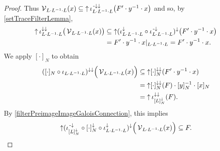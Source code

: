 \begin{proof}
Thus $\operatorname{\mathcal{V}}_{L\cdot L^{-1}\cdot L}(x) \subseteq \operatorname{\uparrow}\iota_{L\cdot L^{-1}\cdot L}^{{\text{\hspace{0.15em}-}\downarrow}\downarrow}\big(F'\cdot y^{-1}\cdot x\big)$ and so, by \ref{setTraceFilterLemma},
\begin{align*}
\operatorname{\uparrow} \iota_{L\cdot L^{-1}\cdot L}^{\downarrow\downarrow}\big(\operatorname{\mathcal{V}}_{L\cdot L^{-1}\cdot L}(x)\big) &\subseteq \operatorname{\uparrow}(\iota_{L\cdot L^{-1}\cdot L}^{\downarrow}\circ \iota_{L\cdot L^{-1}\cdot L}^{{\text{\hspace{0.15em}-}\downarrow}})^\downarrow\big(F'\cdot y^{-1}\cdot x\big) \\
&= F'\cdot y^{-1}\cdot x|_{L\cdot L^{-1}\cdot L} = F'\cdot y^{-1}\cdot x.
\end{align*}
We apply $[\cdot]_N$ to obtain
\begin{align*}
([\cdot]_N\circ \iota_{L\cdot L^{-1}\cdot L})^{\downarrow\downarrow}\Big(\operatorname{\mathcal{V}}_{L\cdot L^{-1}\cdot L}(x)\Big) &\subseteq \operatorname{\uparrow}[\cdot]_N^{\downarrow\downarrow}(F'\cdot y^{-1}\cdot x) \\
&= \operatorname{\uparrow}[\cdot]_N^{\downarrow\downarrow}(F)\cdot [y]_N^{-1} \cdot [x]_N \\
&= \operatorname{\uparrow}\iota^{\downarrow\downarrow}_{[L]_N^{\downarrow}}(F).
\end{align*}
By \ref{filterPreimageImageGaloisConnection}, this implies
\[ \operatorname{\uparrow} (\iota^{{\text{\hspace{0.15em}-}\downarrow}}_{[L]_N^\downarrow} \circ [\cdot]_N^\downarrow\circ \iota_{L\cdot L^{-1}\cdot L}^\downarrow)^{\downarrow}\Big(\operatorname{\mathcal{V}}_{L\cdot L^{-1}\cdot L}(x)\Big) \subseteq F. \]
\end{proof}

